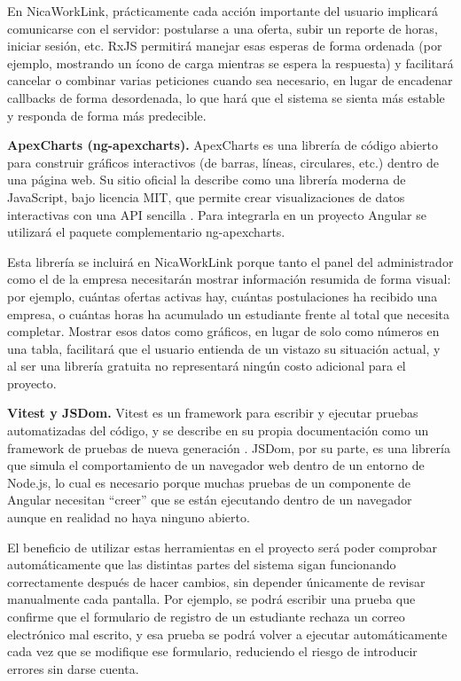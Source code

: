 En NicaWorkLink, prácticamente cada acción importante del usuario implicará comunicarse con el servidor: postularse a una oferta, subir un reporte de horas, iniciar sesión, etc. RxJS permitirá manejar esas esperas de forma ordenada (por ejemplo, mostrando un ícono de carga mientras se espera la respuesta) y facilitará cancelar o combinar varias peticiones cuando sea necesario, en lugar de encadenar callbacks de forma desordenada, lo que hará que el sistema se sienta más estable y responda de forma más predecible.

\textbf{ApexCharts (ng-apexcharts).} ApexCharts es una librería de código abierto para construir gráficos interactivos (de barras, líneas, circulares, etc.) dentro de una página web. Su sitio oficial la describe como una librería moderna de JavaScript, bajo licencia MIT, que permite crear visualizaciones de datos interactivas con una API sencilla \parencite{apexcharts}. Para integrarla en un proyecto Angular se utilizará el paquete complementario ng-apexcharts.

Esta librería se incluirá en NicaWorkLink porque tanto el panel del administrador como el de la empresa necesitarán mostrar información resumida de forma visual: por ejemplo, cuántas ofertas activas hay, cuántas postulaciones ha recibido una empresa, o cuántas horas ha acumulado un estudiante frente al total que necesita completar. Mostrar esos datos como gráficos, en lugar de solo como números en una tabla, facilitará que el usuario entienda de un vistazo su situación actual, y al ser una librería gratuita no representará ningún costo adicional para el proyecto.

\textbf{Vitest y JSDom.} Vitest es un framework para escribir y ejecutar pruebas automatizadas del código, y se describe en su propia documentación como un framework de pruebas de nueva generación \parencite{vitest}. JSDom, por su parte, es una librería que simula el comportamiento de un navegador web dentro de un entorno de Node.js, lo cual es necesario porque muchas pruebas de un componente de Angular necesitan ``creer'' que se están ejecutando dentro de un navegador aunque en realidad no haya ninguno abierto.

El beneficio de utilizar estas herramientas en el proyecto será poder comprobar automáticamente que las distintas partes del sistema sigan funcionando correctamente después de hacer cambios, sin depender únicamente de revisar manualmente cada pantalla. Por ejemplo, se podrá escribir una prueba que confirme que el formulario de registro de un estudiante rechaza un correo electrónico mal escrito, y esa prueba se podrá volver a ejecutar automáticamente cada vez que se modifique ese formulario, reduciendo el riesgo de introducir errores sin darse cuenta.

